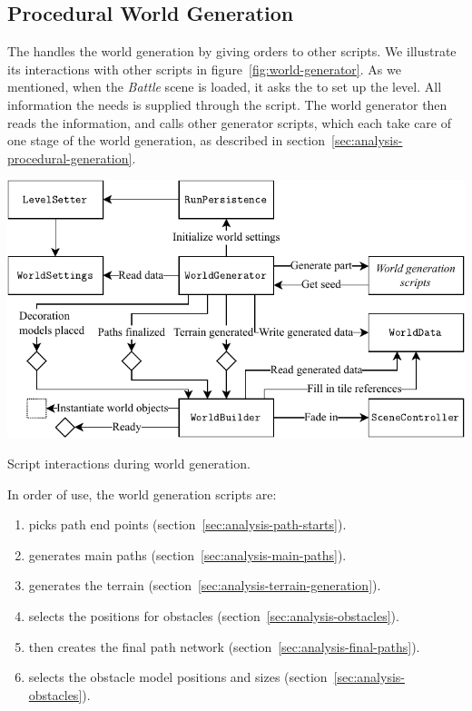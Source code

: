 \subsection{Procedural World Generation}\label{sec:docs-world-generation}

The  handles the world generation by giving orders to other scripts.
We illustrate its interactions with other scripts in figure~\ref{fig:world-generator}.
As we mentioned, when the \emph{Battle} scene is loaded, it asks the  to set up the level.
All information the  needs is supplied through the  script.
The world generator then reads the information, and calls other generator scripts, which each take care of one stage of the world generation, as described in section~\ref{sec:analysis-procedural-generation}.

\begin{center}
    \captionsetup{type=figure}
    \includegraphics[width=\textwidth]{img/world generator.pdf}
    \caption{Script interactions during world generation.}
    \label{fig:world-generator}
\end{center}

In order of use, the world generation scripts are:
\begin{enumerate}
    \item {} picks path end points (section~\ref{sec:analysis-path-starts}).
    \item {} generates main paths (section~\ref{sec:analysis-main-paths}).
    \item {} generates the terrain (section~\ref{sec:analysis-terrain-generation}).
    \item {} selects the positions for obstacles (section~\ref{sec:analysis-obstacles}).
    \item {} then creates the final path network (section~\ref{sec:analysis-final-paths}).
    \item {} selects the obstacle model positions and sizes (section~\ref{sec:analysis-obstacles}).
\end{enumerate}

